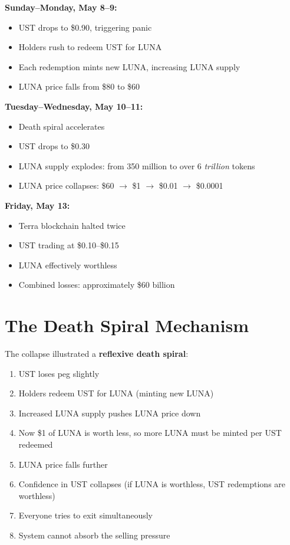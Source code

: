 \documentclass[11pt]{article}
\begin{document}
\medskip
\noindent\textbf{Sunday--Monday, May 8--9:}
\begin{itemize}[leftmargin=*]
\item UST drops to \$0.90, triggering panic
\item Holders rush to redeem UST for LUNA
\item Each redemption mints new LUNA, increasing LUNA supply
\item LUNA price falls from \$80 to \$60
\end{itemize}

\medskip
\noindent\textbf{Tuesday--Wednesday, May 10--11:}
\begin{itemize}[leftmargin=*]
\item Death spiral accelerates
\item UST drops to \$0.30
\item LUNA supply explodes: from 350 million to over 6 \textit{trillion} tokens
\item LUNA price collapses: \$60 $\rightarrow$ \$1 $\rightarrow$ \$0.01 $\rightarrow$ \$0.0001
\end{itemize}

\medskip
\noindent\textbf{Friday, May 13:}
\begin{itemize}[leftmargin=*]
\item Terra blockchain halted twice
\item UST trading at \$0.10--\$0.15
\item LUNA effectively worthless
\item Combined losses: approximately \$60 billion
\end{itemize}

\section*{The Death Spiral Mechanism}

The collapse illustrated a \textbf{reflexive death spiral}:

\begin{enumerate}[leftmargin=*]
\item UST loses peg slightly
\item Holders redeem UST for LUNA (minting new LUNA)
\item Increased LUNA supply pushes LUNA price down
\item Now \$1 of LUNA is worth less, so more LUNA must be minted per UST redeemed
\item LUNA price falls further
\item Confidence in UST collapses (if LUNA is worthless, UST redemptions are worthless)
\item Everyone tries to exit simultaneously
\item System cannot absorb the selling pressure
\end{enumerate}
\end{document}
